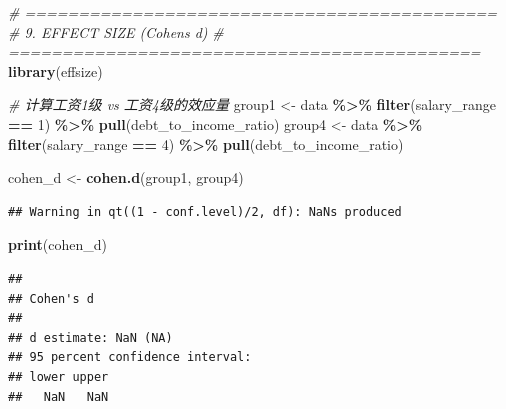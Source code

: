\documentclass[
]{article}
\newenvironment{Shaded}{\begin{snugshade}}{\end{snugshade}}
\newcommand{\CommentTok}[1]{\textcolor[rgb]{0.56,0.35,0.01}{\textit{#1}}}
\newcommand{\DecValTok}[1]{\textcolor[rgb]{0.00,0.00,0.81}{#1}}
\newcommand{\FunctionTok}[1]{\textcolor[rgb]{0.13,0.29,0.53}{\textbf{#1}}}
\newcommand{\NormalTok}[1]{#1}
\newcommand{\OtherTok}[1]{\textcolor[rgb]{0.56,0.35,0.01}{#1}}
\newcommand{\SpecialCharTok}[1]{\textcolor[rgb]{0.81,0.36,0.00}{\textbf{#1}}}
\begin{document}
\begin{Shaded}
\begin{Highlighting}[]
\CommentTok{\# ============================================}
\CommentTok{\# 9. EFFECT SIZE (Cohen\textquotesingle{}s d)}
\CommentTok{\# ============================================}
\FunctionTok{library}\NormalTok{(effsize)}

\CommentTok{\# 计算工资1级 vs 工资4级的效应量}
\NormalTok{group1 }\OtherTok{\textless{}{-}}\NormalTok{ data }\SpecialCharTok{\%\textgreater{}\%} \FunctionTok{filter}\NormalTok{(salary\_range }\SpecialCharTok{==} \DecValTok{1}\NormalTok{) }\SpecialCharTok{\%\textgreater{}\%} \FunctionTok{pull}\NormalTok{(debt\_to\_income\_ratio)}
\NormalTok{group4 }\OtherTok{\textless{}{-}}\NormalTok{ data }\SpecialCharTok{\%\textgreater{}\%} \FunctionTok{filter}\NormalTok{(salary\_range }\SpecialCharTok{==} \DecValTok{4}\NormalTok{) }\SpecialCharTok{\%\textgreater{}\%} \FunctionTok{pull}\NormalTok{(debt\_to\_income\_ratio)}

\NormalTok{cohen\_d }\OtherTok{\textless{}{-}} \FunctionTok{cohen.d}\NormalTok{(group1, group4)}
\end{Highlighting}
\end{Shaded}

\begin{verbatim}
## Warning in qt((1 - conf.level)/2, df): NaNs produced
\end{verbatim}

\begin{Shaded}
\begin{Highlighting}[]
\FunctionTok{print}\NormalTok{(cohen\_d)}
\end{Highlighting}
\end{Shaded}

\begin{verbatim}
## 
## Cohen's d
## 
## d estimate: NaN (NA)
## 95 percent confidence interval:
## lower upper 
##   NaN   NaN
\end{verbatim}
\end{document}
